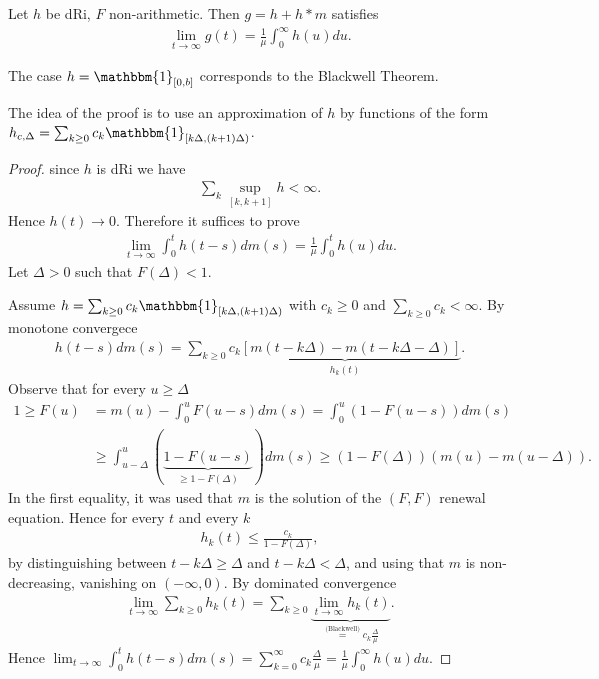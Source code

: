\begin{theorem}
	Let $h$ be dRi, $F$ non-arithmetic. Then $g=h+h*m$ satisfies 
\begin{align}
\boxed{\lim_{t \to \infty}g(t)= \frac{1}{\mu } \int_{0}^{\infty} h(u) du.}
\end{align}
\end{theorem}

\begin{rmk}[]
	The case $h= \mathbbm{1}_{[0,b]}$ corresponds to the Blackwell Theorem. 
\end{rmk}

{\color{blue}The idea of the proof is to use an approximation of $h$ by functions of the form $h_{c,\Delta}=\sum_{k\geq 0}^{} c_k \mathbbm{1} _{[k\Delta, (k+1)\Delta)}$.}

\begin{proof}
	since $h$ is dRi we have
	\begin{align}
		\sum_{k}^{} \sup_{[k,k+1]}h<\infty.
	\end{align}
	Hence $h(t) \to 0$. Therefore it suffices to prove
	\begin{align}
		\lim_{t\to \infty} \int_{0}^{t} h(t-s)dm(s) = \frac{1}{\mu }\int_{0}^{t} h(u)du.
	\end{align}
	Let $\Delta>0$ such that $F(\Delta) < 1$. 

	Assume $h = \sum_{k\geq 0}^{} c_k \mathbbm{1}_{[k\Delta, (k+1)\Delta)} $ with  $c_k\geq 0$ and $\sum_{k\geq 0}^{} c_k < \infty$. By monotone convergece
	\begin{align}
		h(t-s)dm(s) = \sum_{k\geq 0}^{} \underbrace{c_k [m(t - k\Delta) - m(t-k\Delta - \Delta)]}_{h_{k}(t)}.
	\end{align}
Observe that for every $u\geq \Delta$
 \begin{align}
	 1 \geq F(u) &= m(u) - \int_{0}^{u} F(u-s)dm(s) = \int_{0}^{u} (1-F(u-s))dm(s) \\
		     &\geq \int_{u-\Delta}^{u} (\underbrace{1-F(u-s)}_{\geq1-F(\Delta)}) dm(s) \geq \left(1-F(\Delta)\right)\left(m(u) - m(u-\Delta)\right). 
\end{align}
In the first equality, it was used that $m$ is the solution of the $(F,F)$ renewal equation. Hence for every $t$ and every $k$ 
\begin{align}
	h_k(t) \leq \frac{c_k}{1-F(\Delta)},
\end{align}
by distinguishing between $t-k\Delta \geq \Delta$ and $t-k\Delta<\Delta$, and using that $m$ is non-decreasing, vanishing on $(-\infty, 0)$.
By dominated convergence
\begin{align}
	\lim_{t\to \infty} \sum_{k\geq 0}^{} h_k(t) = \sum_{k\geq 0}^{} \underbrace{\lim_{t\to \infty} h_k(t)}_{\stackrel{\textrm{(Blackwell)}}{=} c_k \frac{\Delta}{\mu }}.
\end{align}
Hence $\lim_{t\to \infty} \int_{0}^{t} h(t-s)dm(s) = \sum_{k=0}^{\infty} c_k \frac{\Delta}{\mu } = \frac{1}{\mu }\int_{0}^{\infty} h(u)du.$ 


\end{proof}
